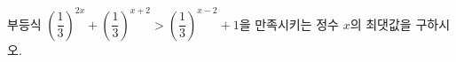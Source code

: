 부등식 $\left(\dfrac{1}{3}\right)^{2x}+\left(\dfrac{1}{3}\right)^{x+2}>\left(\dfrac{1}{3}\right)^{x-2}+1$을 만족시키는 정수 $x$의 최댓값을 구하시오.
